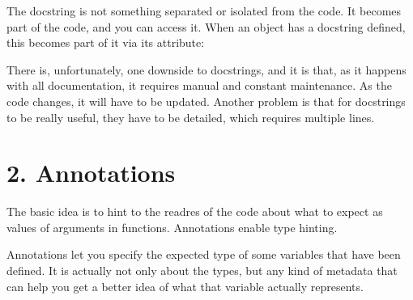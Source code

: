 \documentclass[a4paper,10pt,english]{sphinxmanual}
\begin{document}
The docstring is not something separated or isolated from the code. It becomes part of the code, and you can
access it. When an object has a docstring defined, this becomes part of it via its  attribute:

\begin{sphinxVerbatim}[commandchars=\\\{\}]
 

 
\end{sphinxVerbatim}

There is, unfortunately, one downside to docstrings, and it is that, as it happens with all documentation, it
requires manual and constant maintenance. As the code changes, it will have to be updated. Another problem is
that for docstrings to be really useful, they have to be detailed, which requires multiple lines.


\section{2. Annotations}
\label{\detokenize{chapters/1_docstrings_and_annotations/index:annotations}}
The basic idea is to hint to the readres of the code about what to expect as values of arguments in functions.
Annotations enable type hinting.

Annotations let you specify the expected type of some variables that have been defined. It is actually not
only about the types, but any kind of metadata that can help you get a better idea of what that variable
actually represents.

\begin{sphinxVerbatim}[commandchars=\\\{\}]
 
       
          
          

       
\end{sphinxVerbatim}
\end{document}
